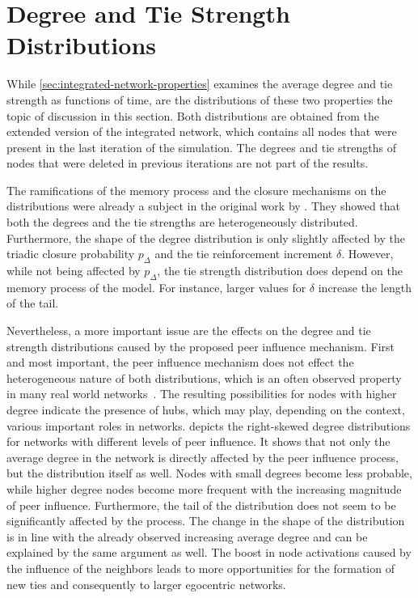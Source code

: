 

\section{Degree and Tie Strength Distributions}
\label{sec:weight-and-degree-distribution}

While \cref{sec:integrated-network-properties} examines the average degree and tie strength as functions of time, are the distributions of these two properties the topic of discussion in this section.
Both distributions are obtained from the extended version of the integrated network, which contains all nodes that were present in the last iteration of the simulation.
The degrees and tie strengths of nodes that were deleted in previous iterations are not part of the results.

The ramifications of the memory process and the closure mechanisms on the distributions were already a subject in the original work by \citet{Laurent2015}.
They showed that both the degrees and the tie strengths are heterogeneously distributed.
Furthermore, the shape of the degree distribution is only slightly affected by the triadic closure probability \( p_{\Delta} \) and the tie reinforcement increment \( \delta \).
However, while not being affected by \( p_{\Delta} \), the tie strength distribution does depend on the memory process of the model.
For instance, larger values for \( \delta \) increase the length of the tail.

Nevertheless, a more important issue are the effects on the degree and tie strength distributions caused by the proposed peer influence mechanism.
First and most important, the peer influence mechanism does not effect the heterogeneous nature of both distributions, which is an often observed property in many real world networks~\cite{Barabasi2002, Karsai2014}.
The resulting possibilities for nodes with higher degree indicate the presence of hubs, which may play, depending on the context, various important roles in networks.
 depicts the right-skewed degree distributions for networks with different levels of peer influence.
It shows that not only the average degree in the network is directly affected by the peer influence process, but the distribution itself as well.
Nodes with small degrees become less probable, while higher degree nodes become more frequent with the increasing magnitude of peer influence.
Furthermore, the tail of the distribution does not seem to be significantly affected by the process.
The change in the shape of the distribution is in line with the already observed increasing average degree and can be explained by the same argument as well.
The boost in node activations caused by the influence of the neighbors leads to more opportunities for the formation of new ties and consequently to larger egocentric networks.


